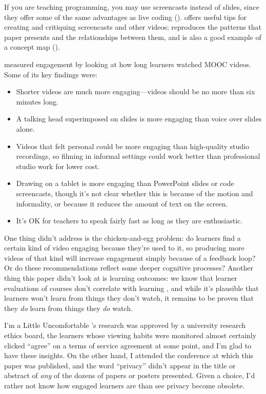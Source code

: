If you are teaching programming, you may use screencasts instead of
slides, since they offer some of the same advantages as live coding
(). \cite{Chen2009} offers useful tips
for creating and critiquing screencasts and other videos;
 reproduces the patterns that paper
presents and the relationships between them, and is also a good example
of a concept map ().


\cite{Guo2014} measured engagement by looking at how long learners
watched MOOC videos. Some of its key findings were:

\begin{itemize}
\item
  Shorter videos are much more engaging---videos should be no more than
  six minutes long.
\item
  A talking head superimposed on slides is more engaging than voice
  over slides alone.
\item
  Videos that felt personal could be more engaging than high-quality
  studio recordings, so filming in informal settings could work better
  than professional studio work for lower cost.
\item
  Drawing on a tablet is more engaging than PowerPoint slides or code
  screencasts, though it's not clear whether this is because of the
  motion and informality, or because it reduces the amount of text on
  the screen.
\item
  It's OK for teachers to speak fairly fast as long as they are
  enthusiastic.
\end{itemize}

One thing \cite{Guo2014} didn't address is the chicken-and-egg
problem: do learners find a certain kind of video engaging because
they're used to it, so producing more videos of that kind will
increase engagement simply because of a feedback loop? Or do these
recommendations reflect some deeper cognitive processes? Another thing
this paper didn't look at is learning outcomes: we know that learner
evaluations of courses don't correlate with learning
\cite{Star2014,Uttl2017}, and while it's plausible that
learners won't learn from things they don't watch, it remains to be
proven that they \emph{do} learn from things they \emph{do} watch.

\begin{aside}{I'm a Little Uncomfortable}
  \cite{Guo2014}'s research was approved by a university research
  ethics board, the learners whose viewing habits were monitored almost
  certainly clicked ``agree'' on a terms of service agreement at some
  point, and I'm glad to have these insights. On the other hand, I
  attended the conference at which this paper was published, and the
  word ``privacy'' didn't appear in the title or abstract of \emph{any} of the
  dozens of papers or posters presented. Given a choice, I'd rather not
  know how engaged learners are than see privacy become obsolete.
\end{aside}

